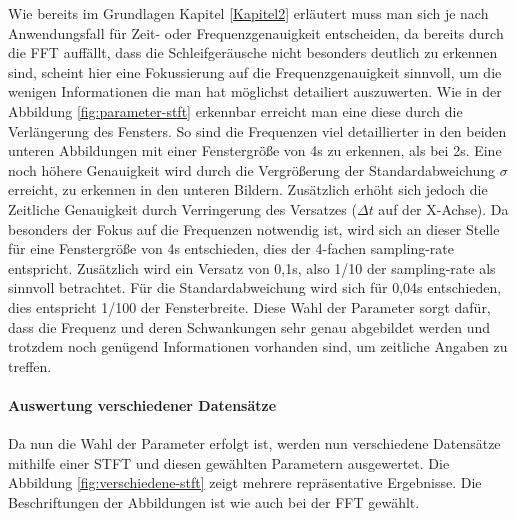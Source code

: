 Wie bereits im Grundlagen Kapitel \ref{Kapitel2} erläutert muss man sich je nach Anwendungsfall für Zeit- oder Frequenzgenauigkeit entscheiden, da bereits durch die \ac{FFT} auffällt, dass die Schleifgeräusche nicht besonders deutlich zu erkennen sind, scheint hier eine Fokussierung auf die Frequenzgenauigkeit sinnvoll, um die wenigen Informationen die man hat möglichst detailiert auszuwerten. Wie in der Abbildung \ref{fig:parameter-stft} erkennbar erreicht man eine diese durch die Verlängerung des Fensters. So sind die Frequenzen viel detaillierter in den beiden unteren Abbildungen mit einer Fenstergröße von 4s zu erkennen, als bei 2s. Eine noch höhere Genauigkeit wird durch die Vergrößerung der Standardabweichung \(\sigma\) erreicht, zu erkennen in den unteren Bildern. Zusätzlich erhöht sich jedoch die Zeitliche Genauigkeit durch Verringerung des Versatzes (\(\Delta t\) auf der X-Achse). Da besonders der Fokus auf die Frequenzen notwendig ist, wird sich an dieser Stelle für eine Fenstergröße von 4s entschieden, dies der 4-fachen sampling-rate entspricht. Zusätzlich wird ein Versatz von 0,1s, also 1/10 der sampling-rate als sinnvoll betrachtet. Für die Standardabweichung wird sich für 0,04s entschieden, dies entspricht 1/100 der Fensterbreite. Diese Wahl der Parameter sorgt dafür, dass die Frequenz und deren Schwankungen sehr genau abgebildet werden und trotzdem noch genügend Informationen vorhanden sind, um zeitliche Angaben zu treffen.

\paragraph{Auswertung verschiedener Datensätze}
Da nun die Wahl der Parameter erfolgt ist, werden nun verschiedene Datensätze mithilfe einer \ac{STFT} und diesen gewählten Parametern ausgewertet. Die Abbildung \ref{fig:verschiedene-stft} zeigt mehrere repräsentative Ergebnisse. Die Beschriftungen der Abbildungen ist wie auch bei der \ac{FFT} gewählt.

